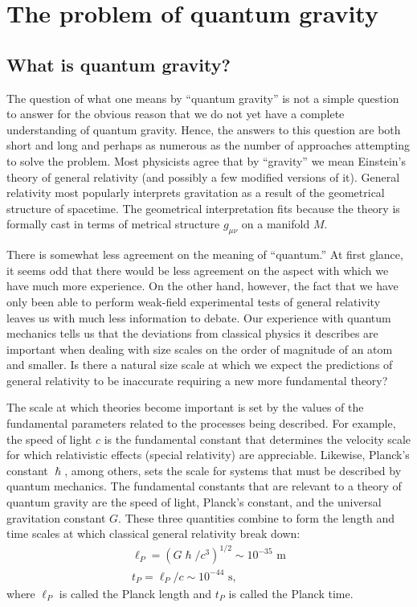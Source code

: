 \documentclass[aps,amssymb,12pt]{revtex4-2}
\begin{document}
\section{The problem of quantum gravity}

\subsection{What is quantum gravity?}

The question of what one means by ``quantum gravity'' is not a simple
question to answer for the obvious reason that we do not yet have a complete
understanding of quantum gravity. Hence, the answers to this question are
both short and long and perhaps as numerous as the number of approaches
attempting to solve the problem. Most physicists agree that by ``gravity''
we mean Einstein's theory of general relativity (and possibly a few modified
versions of it). General relativity most popularly interprets gravitation as
a result of the geometrical structure of spacetime. The geometrical
interpretation fits because the theory is formally cast in terms of metrical
structure $g_{\mu \nu }$ on a manifold $M$.

There is somewhat less agreement on the meaning of ``quantum.'' At first
glance, it seems odd that there would be less agreement on the aspect with
which we have much more experience. On the other hand, however, the fact
that we have only been able to perform weak-field experimental tests of
general relativity leaves us with much less information to debate. Our
experience with quantum mechanics tells us that the deviations from
classical physics it describes are important when dealing with size scales
on the order of magnitude of an atom and smaller. Is there a natural size
scale at which we expect the predictions of general relativity to be
inaccurate requiring a new more fundamental theory?

The scale at which theories become important is set by the values of the
fundamental parameters related to the processes being described. For
example, the speed of light $c$ is the fundamental constant that determines
the velocity scale for which relativistic effects (special relativity) are
appreciable. Likewise, Planck's constant $\hslash $, among others, sets the
scale for systems that must be described by quantum mechanics. The
fundamental constants that are relevant to a theory of quantum gravity are
the speed of light, Planck's constant, and the universal gravitation
constant $G$. These three quantities combine to form the length and time
scales at which classical general relativity break down:
\begin{equation}
\left.
\begin{array}{l}
\ell _P=\left( G\hslash /c^3\right) ^{1/2}\sim 10^{-35}\text{ m} \\
t_P=\ell _P/c\sim 10^{-44}\text{ s,}
\end{array}
\right.  \label{1}
\end{equation}
where $\ell _P$ is called the Planck length and $t_P$ is called the Planck
time.
\end{document}
